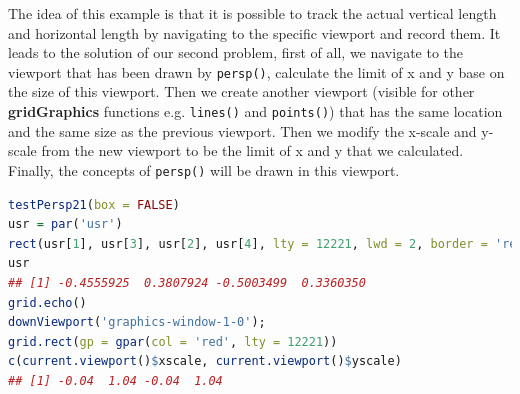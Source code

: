 \documentclass[11pt]{report}
\begin{document}
\newpage
The idea of this example is that it is possible to track the actual vertical length and horizontal length by navigating to the specific viewport and record them. It leads to the solution of our second problem, first of all, we navigate to the viewport that has been drawn by \texttt{persp()}, calculate the limit of x and y base on the size of this viewport. Then we create another viewport (visible for other \textbf{gridGraphics} functions e.g. \texttt{lines()} and \texttt{points()}) that has the same location and the same size as the previous viewport. Then we modify the x-scale and y-scale from the new viewport to be the limit of x and y that we calculated. Finally, the concepts of \texttt{persp()} will be drawn in this viewport. \\

\begin{lstlisting}[language = R]
testPersp21(box = FALSE)
usr = par('usr')
rect(usr[1], usr[3], usr[2], usr[4], lty = 12221, lwd = 2, border = 'red')
usr
## [1] -0.4555925  0.3807924 -0.5003499  0.3360350
grid.echo()
downViewport('graphics-window-1-0'); 
grid.rect(gp = gpar(col = 'red', lty = 12221))
c(current.viewport()$xscale, current.viewport()$yscale)
## [1] -0.04  1.04 -0.04  1.04
\end{lstlisting}
\end{document}
